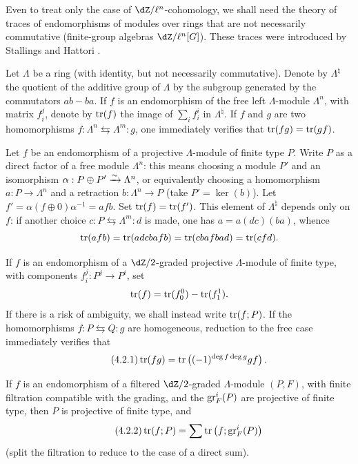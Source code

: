 Even to treat only the case of $\dZ/\ell^n$-cohomology, we shall need the
theory of traces of endomorphisms of modules over rings that are not
necessarily commutative (finite-group algebras $\dZ/\ell^n[G]$). These
traces were introduced by Stallings and Hattori \cite{ba76}.

Let $\Lambda$ be a ring (with identity, but not necessarily commutative).
Denote by $\Lambda^\natural$ the quotient of the additive group of $\Lambda$
by the subgroup generated by the commutators $a b-b a$. If $f$ is an
endomorphism of the free left $\Lambda$-module $\Lambda^n$, with matrix
$f_i^j$, denote by $\operatorname{tr}(f)$ the image of $\sum_i f_i^i$ in
$\Lambda^\natural$. If $f$ and $g$ are two homomorphisms
$f:\Lambda^n \leftrightarrows \Lambda^m : g$, one immediately verifies that
$\operatorname{tr}(f g) = \operatorname{tr}(g f)$.

Let $f$ be an endomorphism of a projective $\Lambda$-module of finite type
$P$. Write $P$ as a direct factor of a free module $\Lambda^n$: this means
choosing a module $P'$ and an isomorphism
$\alpha:P\oplus P'\xrightarrow\sim \Lambda^n$, or equivalently choosing a homomorphism
$a:P\to \Lambda^n$ and a retraction $b:\Lambda^n\to P$ (take
$P'=\ker(b)$). Let $f'=\alpha(f\oplus 0)\alpha^{-1} =af b$. Set
$\operatorname{tr}(f) = \operatorname{tr}(f')$. This element of $\Lambda^\natural$ depends only on $f$:
if another choice $c:P\leftrightarrows \Lambda^m:d$ is made, one has
$a=a(dc)(ba)$, whence
\[
 \operatorname{tr}(a f b) = \operatorname{tr}(adcbafb) = \operatorname{tr}(cbafbad) = \operatorname{tr}(cfd) \text{.}
\]

If $f$ is an endomorphism of a $\dZ/2$-graded projective
$\Lambda$-module of finite type, with components $f_i^j:P^j\to P^i$, set
\[
  \operatorname{tr}(f) = \operatorname{tr}(f_0^0) - \operatorname{tr}(f_1^1) \text{.}
\]
If there is a risk of ambiguity, we shall instead write $\operatorname{tr}(f;P)$. If the
homomorphisms $f:P\leftrightarrows Q:g$ are homogeneous, reduction to the
free case immediately verifies that
\begin{equation*}\tag{4.2.1}\label{II:eq:4-2-1}
  \operatorname{tr}(f g) = \operatorname{tr}\left((-1)^{\deg f \deg g} g f\right) \text{.}
\end{equation*}

If $f$ is an endomorphism of a filtered $\dZ/2$-graded $\Lambda$-module
$(P,F)$, with finite filtration compatible with the grading, and the
$\operatorname{gr}_F^i(P)$ are projective of finite type, then $P$ is projective of finite
type, and
\begin{equation*}\tag{4.2.2}\label{II:eq:4-2-2}
  \operatorname{tr}(f;P) = \sum \operatorname{tr}\left(f; \operatorname{gr}_F^i(P) \right)
\end{equation*}
(split the filtration to reduce to the case of a direct sum).






